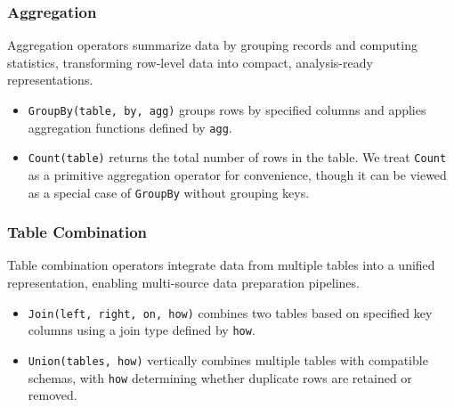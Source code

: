 \subsubsection{Aggregation}
Aggregation operators summarize data by grouping records and computing statistics, transforming row-level data into compact, analysis-ready representations.
%
\begin{itemize}[leftmargin=*]
    \item \texttt{GroupBy(table, by, agg)} groups rows by specified columns and applies aggregation functions defined by \texttt{agg}.
    \item \texttt{Count(table)} returns the total number of rows in the table. We treat \texttt{Count} as a primitive aggregation operator for convenience, though it can be viewed as a special case of \texttt{GroupBy} without grouping keys.
\end{itemize}

\subsubsection{Table Combination}
Table combination operators integrate data from multiple tables into a unified representation, enabling multi-source data preparation pipelines.
%
\begin{itemize}[leftmargin=*]
    \item \texttt{Join(left, right, on, how)} combines two tables based on specified key columns using a join type defined by \texttt{how}.
    \item \texttt{Union(tables, how)} vertically combines multiple tables with compatible schemas, with \texttt{how} determining whether duplicate rows are retained or removed.
\end{itemize}

